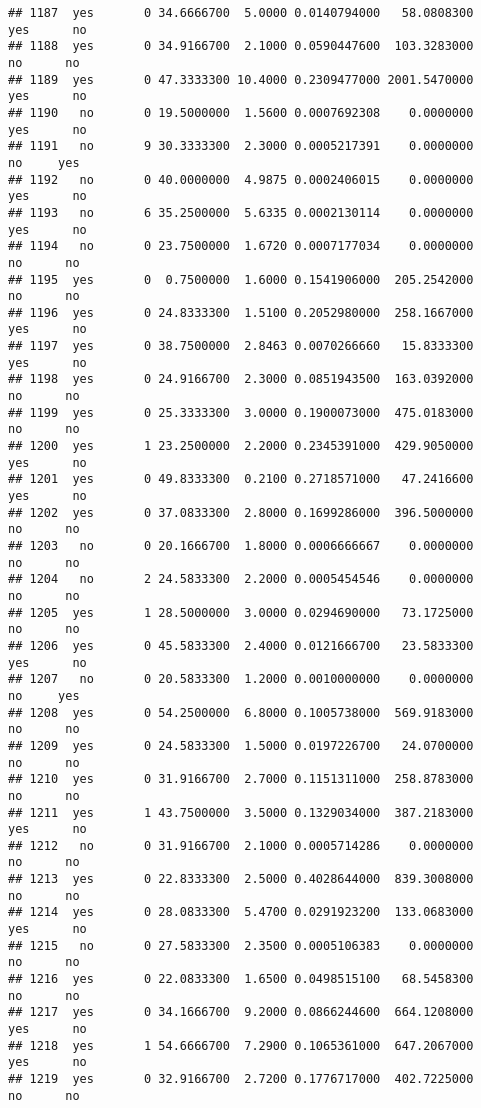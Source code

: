\documentclass[]{article}
\begin{document}
\begin{verbatim}
## 1187  yes       0 34.6666700  5.0000 0.0140794000   58.0808300   yes      no
## 1188  yes       0 34.9166700  2.1000 0.0590447600  103.3283000    no      no
## 1189  yes       0 47.3333300 10.4000 0.2309477000 2001.5470000   yes      no
## 1190   no       0 19.5000000  1.5600 0.0007692308    0.0000000   yes      no
## 1191   no       9 30.3333300  2.3000 0.0005217391    0.0000000    no     yes
## 1192   no       0 40.0000000  4.9875 0.0002406015    0.0000000   yes      no
## 1193   no       6 35.2500000  5.6335 0.0002130114    0.0000000   yes      no
## 1194   no       0 23.7500000  1.6720 0.0007177034    0.0000000    no      no
## 1195  yes       0  0.7500000  1.6000 0.1541906000  205.2542000    no      no
## 1196  yes       0 24.8333300  1.5100 0.2052980000  258.1667000   yes      no
## 1197  yes       0 38.7500000  2.8463 0.0070266660   15.8333300   yes      no
## 1198  yes       0 24.9166700  2.3000 0.0851943500  163.0392000    no      no
## 1199  yes       0 25.3333300  3.0000 0.1900073000  475.0183000    no      no
## 1200  yes       1 23.2500000  2.2000 0.2345391000  429.9050000   yes      no
## 1201  yes       0 49.8333300  0.2100 0.2718571000   47.2416600   yes      no
## 1202  yes       0 37.0833300  2.8000 0.1699286000  396.5000000    no      no
## 1203   no       0 20.1666700  1.8000 0.0006666667    0.0000000    no      no
## 1204   no       2 24.5833300  2.2000 0.0005454546    0.0000000    no      no
## 1205  yes       1 28.5000000  3.0000 0.0294690000   73.1725000    no      no
## 1206  yes       0 45.5833300  2.4000 0.0121666700   23.5833300   yes      no
## 1207   no       0 20.5833300  1.2000 0.0010000000    0.0000000    no     yes
## 1208  yes       0 54.2500000  6.8000 0.1005738000  569.9183000    no      no
## 1209  yes       0 24.5833300  1.5000 0.0197226700   24.0700000    no      no
## 1210  yes       0 31.9166700  2.7000 0.1151311000  258.8783000    no      no
## 1211  yes       1 43.7500000  3.5000 0.1329034000  387.2183000   yes      no
## 1212   no       0 31.9166700  2.1000 0.0005714286    0.0000000    no      no
## 1213  yes       0 22.8333300  2.5000 0.4028644000  839.3008000    no      no
## 1214  yes       0 28.0833300  5.4700 0.0291923200  133.0683000   yes      no
## 1215   no       0 27.5833300  2.3500 0.0005106383    0.0000000    no      no
## 1216  yes       0 22.0833300  1.6500 0.0498515100   68.5458300    no      no
## 1217  yes       0 34.1666700  9.2000 0.0866244600  664.1208000   yes      no
## 1218  yes       1 54.6666700  7.2900 0.1065361000  647.2067000   yes      no
## 1219  yes       0 32.9166700  2.7200 0.1776717000  402.7225000    no      no

\end{verbatim}
\end{document}

